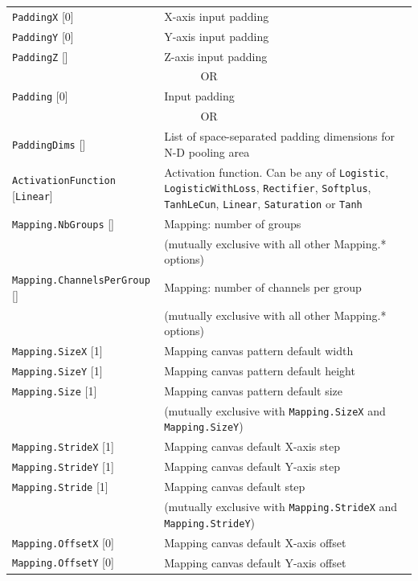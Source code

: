 \documentclass[a4paper,11pt,oneside]{article}
\begin{document}
\begin{center}
\begin{longtable}{| p{5cm} | p{10cm} | }
  \hline
  \lstinline!PaddingX! [0] & X-axis input padding \\
  \lstinline!PaddingY! [0] & Y-axis input padding \\
  \lstinline!PaddingZ! [] & Z-axis input padding \\
  \multicolumn{2}{|c|}{\cellcolor{clrgray}\tiny OR} \\
  \lstinline!Padding! [0] & Input padding \\
  \multicolumn{2}{|c|}{\cellcolor{clrgray}\tiny OR} \\
  \lstinline!PaddingDims! [] & List of space-separated padding dimensions for N-D pooling area \\
  \hline
  \lstinline!ActivationFunction! [\lstinline!Linear!] & Activation function.
  Can be any of \lstinline!Logistic!,  \lstinline!LogisticWithLoss!,
  \lstinline!Rectifier!, \lstinline!Softplus!, \lstinline!TanhLeCun!,
  \lstinline!Linear!, \lstinline!Saturation! or \lstinline!Tanh! \\
  \lstinline!Mapping.NbGroups! [] & Mapping: number of groups \\
   & (mutually exclusive with all other Mapping.* options) \\
  \lstinline!Mapping.ChannelsPerGroup! [] & Mapping: number of channels per group \\
   & (mutually exclusive with all other Mapping.* options) \\
  \lstinline!Mapping.SizeX! [1] & Mapping canvas pattern default width \\
  \lstinline!Mapping.SizeY! [1] & Mapping canvas pattern default height \\
  \lstinline!Mapping.Size! [1] & Mapping canvas pattern default size \\
   & (mutually exclusive with \lstinline!Mapping.SizeX!
   and \lstinline!Mapping.SizeY!) \\
  \lstinline!Mapping.StrideX! [1] & Mapping canvas default X-axis step \\
  \lstinline!Mapping.StrideY! [1] & Mapping canvas default Y-axis step \\
  \lstinline!Mapping.Stride! [1] & Mapping canvas default step \\
   & (mutually exclusive with \lstinline!Mapping.StrideX!
   and \lstinline!Mapping.StrideY!) \\
  \lstinline!Mapping.OffsetX! [0] & Mapping canvas default X-axis offset \\
  \lstinline!Mapping.OffsetY! [0] & Mapping canvas default Y-axis offset \\

\end{longtable}
\end{center}
\end{document}
